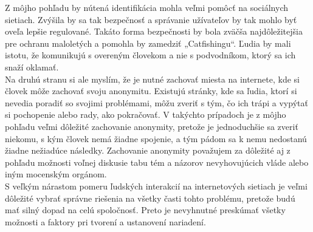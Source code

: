 \documentclass{article}
\begin{document}
Z môjho pohľadu by nútená identifikácia mohla veľmi pomôcť na sociálnych sietiach. Zvýšila by sa tak bezpečnosť a správanie užívateľov by tak mohlo byť oveľa lepšie regulované. Takáto forma bezpečnosti by bola zväčša najdôležitejšia pre ochranu maloletých a pomohla by zamedziť „Catfishingu“. Ľudia by mali istotu, že komunikujú s overeným človekom a nie s podvodníkom,  ktorý sa ich snaží oklamať.\\

Na druhú stranu si ale myslím, že je nutné zachovať miesta na internete, kde si človek môže zachovať svoju anonymitu. Existujú stránky, kde sa ľudia, ktorí si nevedia poradiť so svojimi problémami, môžu zveriť s tým, čo ich trápi a vypýtať si pochopenie alebo rady, ako pokračovať. V takýchto prípadoch je z môjho pohľadu veľmi dôležité zachovanie anonymity, pretože je jednoduchšie sa zveriť niekomu, s kým človek nemá žiadne spojenie, a tým pádom sa k nemu nedostanú žiadne nežiadúce následky. Zachovanie anonymity považujem za dôležité aj z pohľadu možnosti voľnej diskusie tabu tém a názorov nevyhovujúcich vláde alebo iným mocenským orgánom.\\

S veľkým nárastom pomeru ľudských interakcií na internetových  sietiach je veľmi dôležité vybrať správne riešenia na všetky časti tohto problému, pretože budú mať silný dopad na celú spoločnosť. Preto je nevyhnutné preskúmať všetky možnosti a faktory pri tvorení a ustanovení nariadení.\\

\newpage
\printbibliography[heading=bibintoc]
\begingroup
\let\clearpage\relax
\printindex
\endgroup
\end{document}
